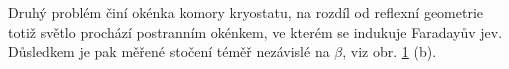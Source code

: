 Druhý problém činí okénka komory kryostatu, na rozdíl od reflexní geometrie totiž světlo prochází postranním okénkem, ve kterém se indukuje Faradayův jev.
Důsledkem je pak měřené stočení téměř nezávislé na $\beta$, viz obr. \ref{fig:vysledky-cofe-lowt-schema-data} (b).

\begin{figure}[htbp]
    \centering
    \missingfigure{}
    \caption{}
    \label{fig:vysledky-cofe-lowt-schema-data}
\end{figure}


